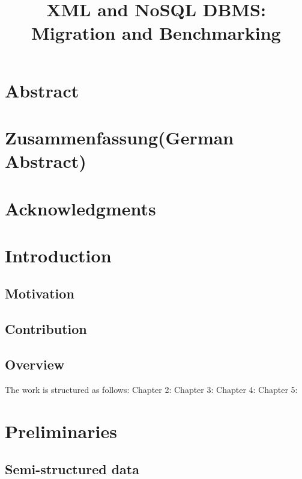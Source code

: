 \documentclass[a4paper,12pt]{article}
\title{XML and NoSQL DBMS: Migration and Benchmarking}
\subtitle{
}
\begin{document}
	
	\renewcommand{\lstlistingname}{Code} 
	
	
	\maketitle
	\thispagestyle{empty}
	
	\newpage
	\section*{Abstract}
	
	\thispagestyle{empty}	
	\newpage
	\section*{Zusammenfassung(German Abstract)}
	
	\newpage
	\section*{Acknowledgments}
	
	\thispagestyle{empty}
	\newpage
	\tableofcontents
	\thispagestyle{empty}
	\newpage
	\section{Introduction}
	\setcounter{page}{1}
	\subsection{Motivation}
		\label{motivation}
		
	
	\subsection{Contribution}
		
		
	\subsection{Overview}
		
		The work is structured as follows:
		Chapter 2:
		Chapter 3:
		Chapter 4:
		Chapter 5: 
		
	\newpage
	\section{Preliminaries}
		\subsection{Semi-structured data}
\end{document}
